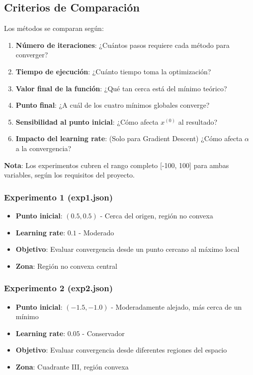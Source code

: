 \documentclass[12pt,a4paper]{article}
\begin{document}
\subsection*{Criterios de Comparación}

Los métodos se comparan según:

\begin{enumerate}
    \item \textbf{Número de iteraciones}: ¿Cuántos pasos requiere cada método para converger?
    \item \textbf{Tiempo de ejecución}: ¿Cuánto tiempo toma la optimización?
    \item \textbf{Valor final de la función}: ¿Qué tan cerca está del mínimo teórico?
    \item \textbf{Punto final}: ¿A cuál de los cuatro mínimos globales converge?
    \item \textbf{Sensibilidad al punto inicial}: ¿Cómo afecta $x^{(0)}$ al resultado?
    \item \textbf{Impacto del learning rate}: (Solo para Gradient Descent) ¿Cómo afecta $\alpha$ a la convergencia?
\end{enumerate}

\textbf{Nota}: Los experimentos cubren el rango completo [-100, 100] para ambas variables, según los requisitos del proyecto.

\subsubsection*{Experimento 1 (exp1.json)}
\begin{itemize}
    \item \textbf{Punto inicial}: $(0.5, 0.5)$ - Cerca del origen, región no convexa
    \item \textbf{Learning rate}: $0.1$ - Moderado
    \item \textbf{Objetivo}: Evaluar convergencia desde un punto cercano al máximo local
    \item \textbf{Zona}: Región no convexa central
\end{itemize}

\subsubsection*{Experimento 2 (exp2.json)}
\begin{itemize}
    \item \textbf{Punto inicial}: $(-1.5, -1.0)$ - Moderadamente alejado, más cerca de un mínimo
    \item \textbf{Learning rate}: $0.05$ - Conservador
    \item \textbf{Objetivo}: Evaluar convergencia desde diferentes regiones del espacio
    \item \textbf{Zona}: Cuadrante III, región convexa
\end{itemize}
\end{document}
